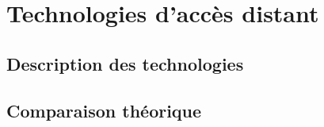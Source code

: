 \part{Technologies d'accès distant}
\chapter{Description des technologies}
\label{ch:dscrp}

\chapter{Comparaison théorique}

